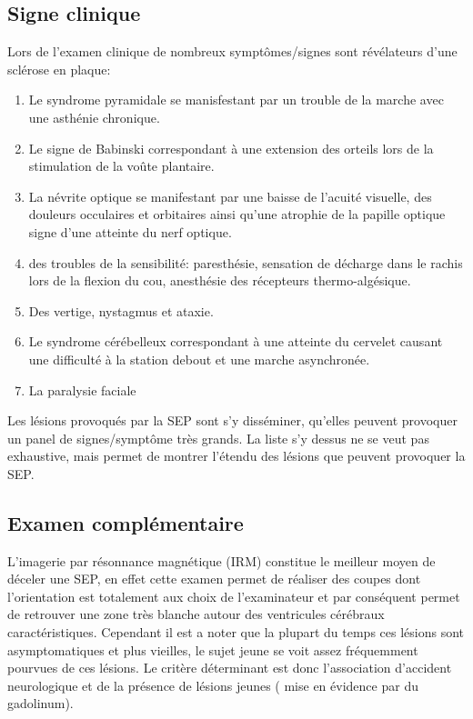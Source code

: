 \documentclass{comjnl}
\begin{document}
\subsection{Signe clinique }
Lors de l'examen clinique de nombreux symptômes/signes sont révélateurs d'une sclérose en plaque:
\begin{enumerate}
\item Le syndrome pyramidale se manisfestant par un trouble de la marche avec une asthénie chronique.
\item Le signe de Babinski correspondant à une extension des orteils lors de la stimulation de la voûte plantaire.
\item La névrite optique se manifestant par une baisse de l'acuité visuelle, des douleurs occulaires et orbitaires ainsi qu'une atrophie de la papille optique signe d'une atteinte du nerf optique.
\item des troubles de la sensibilité: paresthésie, sensation de décharge dans le rachis lors de la flexion du cou, anesthésie des récepteurs thermo-algésique.
\item Des vertige, nystagmus et ataxie.
\item Le syndrome cérébelleux correspondant à une atteinte du cervelet causant une difficulté à la station debout et une marche asynchronée.
\item La paralysie faciale

\end{enumerate}
Les lésions provoqués par la SEP sont s'y disséminer, qu'elles peuvent provoquer un panel de signes/symptôme très grands. La liste s'y dessus ne se veut pas exhaustive, mais permet de montrer l'étendu des lésions que peuvent provoquer la SEP.

\subsection{Examen complémentaire}
L'imagerie par résonnance magnétique (IRM) constitue le meilleur moyen de déceler une SEP, en effet cette examen permet de réaliser des coupes dont l'orientation est totalement aux choix de l'examinateur et par conséquent permet de retrouver une zone très blanche autour des ventricules cérébraux caractéristiques. Cependant il est a noter que la plupart du temps ces lésions sont asymptomatiques et plus vieilles, le sujet jeune se voit assez fréquemment pourvues de ces lésions. Le critère déterminant est donc l'association d'accident neurologique et de la présence de lésions jeunes ( mise en évidence par du gadolinum).
\end{document}

